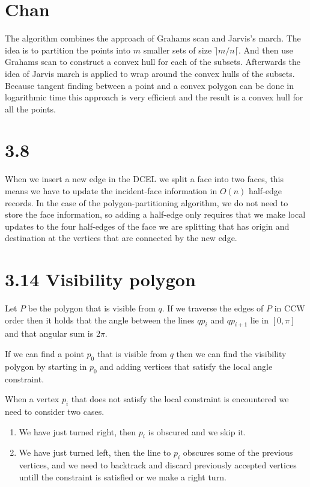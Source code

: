 \documentclass[10pt,a4paper,final,oneside,openany,article]{memoir}
\begin{document}
\chapter*{Chan}
The algorithm combines the approach of Grahams scan and Jarvis’s march. The
idea is to partition the points into $m$ smaller sets of size $\rceil m/n
\lceil$. And then use Grahams scan to construct a convex hull for each of the
subsets. Afterwards the idea of Jarvis march is applied to wrap around the
convex hulls of the subsets. Because tangent finding between a point and a
convex polygon can be done in logarithmic time this approach is very efficient
and the result is a convex hull for all the points.


\chapter*{3.8}
When we insert a new edge in the DCEL we split a face into two faces, this means we have to update the incident-face information in $O(n)$ half-edge records. In the case of the polygon-partitioning algorithm, we do not need to store the face information, so adding a half-edge only requires that we make local updates to the four half-edges of the face we are splitting that has origin and destination at the vertices that are connected by the new edge. 

\chapter*{3.14 Visibility polygon}
Let $P$ be the polygon that is visible from $q$. If we traverse the edges of $P$ in CCW order then it holds that the angle between the lines $qp_i$ and $qp_{i+1}$ lie in $[0, \pi]$ and that angular sum is $2\pi$.

If we can find a point $p_0$ that is visible from $q$ then we can find the visibility polygon by starting in $p_0$ and adding vertices that satisfy the local angle constraint.

When a vertex $p_i$ that does not satisfy the local constraint is encountered we need to consider two cases. 
\begin{enumerate}
\item We have just turned right, then $p_i$ is obscured and we skip it.
\item We have just turned left, then the line to $p_i$ obscures some of the previous vertices, and we need to backtrack and discard previously accepted vertices untill the constraint is satisfied or we make a right turn. 
\end{enumerate}
\end{document}

